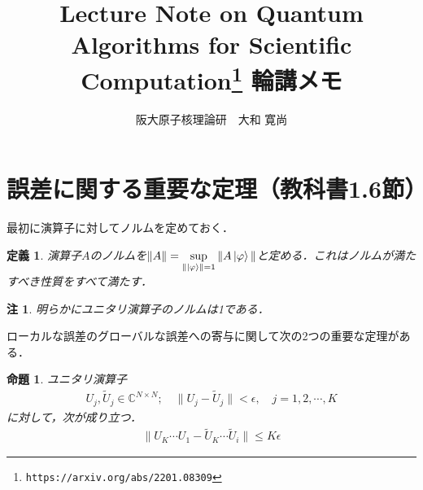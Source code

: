 \documentclass[dvipdfmx]{jarticle}
\title{{\bf Lecture Note on Quantum Algorithms for Scientific Computation\footnote{\texttt{https://arxiv.org/abs/2201.08309}} 輪講メモ}}
\author{阪大原子核理論研　大和 寛尚}
\date{}
\numberwithin{equation}{section}
\theoremstyle{seminar}
\newtheorem{definition}{定義}[section]
\newtheorem{proposition}{命題}[section]
\newtheorem{remark}{注}[section]
\begin{document}
\maketitle
\section{誤差に関する重要な定理（教科書1.6節）}
最初に演算子に対してノルムを定めておく．
\begin{definition}
  演算子$A$のノルムを${\displaystyle \| A \| = \sup_{\|\ket{\varphi}\| = 1} \| A \ket{\varphi} \|}$と定める．これはノルムが満たすべき性質をすべて満たす．
\end{definition}
\begin{remark}
  明らかにユニタリ演算子のノルムは1である．
\end{remark}
ローカルな誤差のグローバルな誤差への寄与に関して次の2つの重要な定理がある．
\begin{proposition}
  ユニタリ演算子
  \begin{align}
    U_j, \tilde{U}_j \in \mathbb{C}^{N \times N} ; \quad \| U_j - \tilde{U}_j\| < \epsilon, \quad j = 1, 2, \cdots, K
  \end{align}
  に対して，次が成り立つ．
  \begin{align}
    \| U_K \cdots U_1 - \tilde{U}_K \cdots \tilde{U}_i \| \leq K\epsilon
  \end{align}
\end{proposition}
\end{document}
